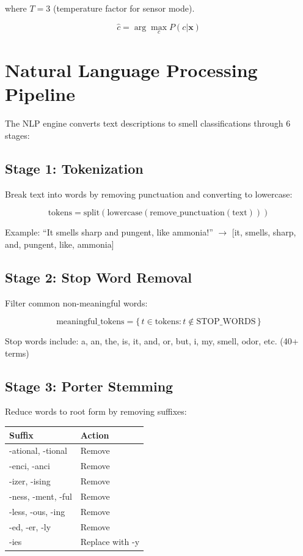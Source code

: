 \documentclass[10pt]{article}
\begin{document}
where $T = 3$ (temperature factor for sensor mode).

\[
\hat{c} = \arg\max_c P(c|\mathbf{x})
\]

\section{Natural Language Processing Pipeline}

The NLP engine converts text descriptions to smell classifications through 6 stages:

\subsection{Stage 1: Tokenization}

Break text into words by removing punctuation and converting to lowercase:

\[
\text{tokens} = \text{split}(\text{lowercase}(\text{remove\_punctuation}(\text{text})))
\]

Example: ``It smells sharp and pungent, like ammonia!'' $\to$ [it, smells, sharp, and, pungent, like, ammonia]

\subsection{Stage 2: Stop Word Removal}

Filter common non-meaningful words:

\[
\text{meaningful\_tokens} = \{\, t \in \text{tokens} : t \notin \text{STOP\_WORDS} \,\}
\]

Stop words include: a, an, the, is, it, and, or, but, i, my, smell, odor, etc. (40+ terms)

\subsection{Stage 3: Porter Stemming}

Reduce words to root form by removing suffixes:

\begin{table}[H]
\centering
\small
\begin{tabular}{|l|l|}
\hline
\textbf{Suffix} & \textbf{Action} \\
\hline
-ational, -tional & Remove \\
-enci, -anci & Remove \\
-izer, -ising & Remove \\
-ness, -ment, -ful & Remove \\
-less, -ous, -ing & Remove \\
-ed, -er, -ly & Remove \\
-ies & Replace with -y \\
\hline
\end{tabular}
\end{table}
\end{document}
